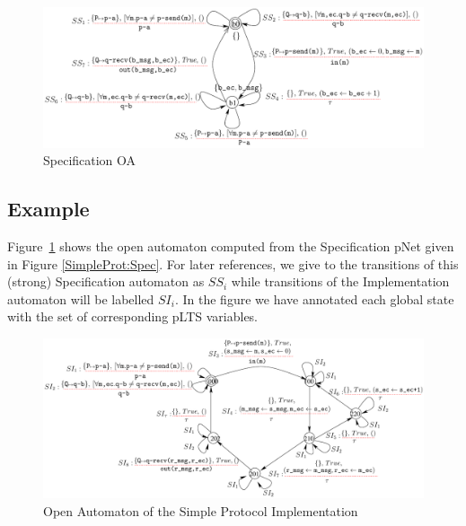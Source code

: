\documentclass{lmcs}
\newcommand{\TODO}[1]{\textcolor{red}{\textbf{[TODO:#1]}}}
\begin{document}






\begin{figure}[ht]
   \centerline{\includegraphics[width=13cm]{XFIG/SPSpecOpen}}
   \caption{Specification OA}
   \label{SimpleProtCounter:SpecOA}
\end{figure}


\subsection*{Example}  Figure~\ref{SimpleProtCounter:SpecOA} shows the open automaton computed from the Specification pNet given in Figure \ref{SimpleProt:Spec}. 
For later references, we give to the transitions of this (strong)
Specification automaton as $SS_i$ while transitions of the
Implementation automaton will be labelled $SI_i$. In the figure we
have annotated each global state with the set of corresponding pLTS variables.


 \begin{figure}[ht]
  \centerline{\includegraphics[width=15cm]{XFIG/SPImplOpen}}
  \caption{Open Automaton of the Simple Protocol Implementation}  \label{SimpleProtCounter:ImplOA}
\end{figure}
\end{document}

